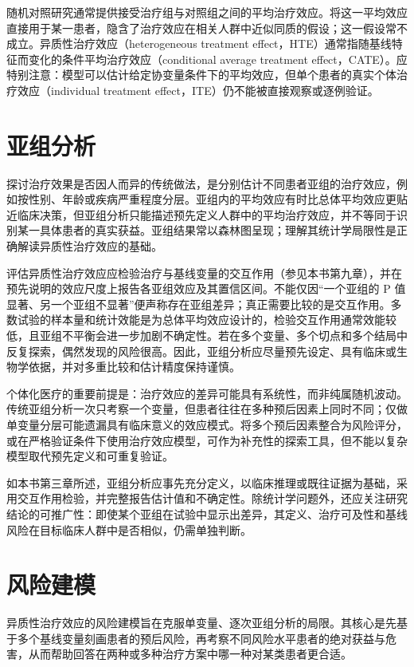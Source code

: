 \documentclass[
  chinese-hans,
  letterpaper,
  DIV=11,
  numbers=noendperiod]{scrreprt}
\begin{document}
随机对照研究通常提供接受治疗组与对照组之间的平均治疗效应。将这一平均效应直接用于某一患者，隐含了治疗效应在相关人群中近似同质的假设；这一假设常不成立。异质性治疗效应（heterogeneous
treatment
effect，HTE）通常指随基线特征而变化的条件平均治疗效应（conditional
average treatment
effect，CATE）。应特别注意：模型可以估计给定协变量条件下的平均效应，但单个患者的真实个体治疗效应（individual
treatment effect，ITE）仍不能被直接观察或逐例验证。

\section{亚组分析}\label{ux4e9aux7ec4ux5206ux6790-1}

探讨治疗效果是否因人而异的传统做法，是分别估计不同患者亚组的治疗效应，例如按性别、年龄或疾病严重程度分层。亚组内的平均效应有时比总体平均效应更贴近临床决策，但亚组分析只能描述预先定义人群中的平均治疗效应，并不等同于识别某一具体患者的真实获益。亚组结果常以森林图呈现；理解其统计学局限性是正确解读异质性治疗效应的基础。

评估异质性治疗效应应检验治疗与基线变量的交互作用（参见本书第九章），并在预先说明的效应尺度上报告各亚组效应及其置信区间。不能仅因``一个亚组的
P
值显著、另一个亚组不显著''便声称存在亚组差异；真正需要比较的是交互作用。多数试验的样本量和统计效能是为总体平均效应设计的，检验交互作用通常效能较低，且亚组不平衡会进一步加剧不确定性。若在多个变量、多个切点和多个结局中反复探索，偶然发现的风险很高。因此，亚组分析应尽量预先设定、具有临床或生物学依据，并对多重比较和估计精度保持谨慎。

个体化医疗的重要前提是：治疗效应的差异可能具有系统性，而非纯属随机波动。传统亚组分析一次只考察一个变量，但患者往往在多种预后因素上同时不同；仅做单变量分层可能遗漏具有临床意义的效应模式。将多个预后因素整合为风险评分，或在严格验证条件下使用治疗效应模型，可作为补充性的探索工具，但不能以复杂模型取代预先定义和可重复验证。

如本书第三章所述，亚组分析应事先充分定义，以临床推理或既往证据为基础，采用交互作用检验，并完整报告估计值和不确定性。除统计学问题外，还应关注研究结论的可推广性：即使某个亚组在试验中显示出差异，其定义、治疗可及性和基线风险在目标临床人群中是否相似，仍需单独判断。

\section{风险建模}\label{ux98ceux9669ux5efaux6a21}

异质性治疗效应的风险建模旨在克服单变量、逐次亚组分析的局限。其核心是先基于多个基线变量刻画患者的预后风险，再考察不同风险水平患者的绝对获益与危害，从而帮助回答在两种或多种治疗方案中哪一种对某类患者更合适。
\end{document}
